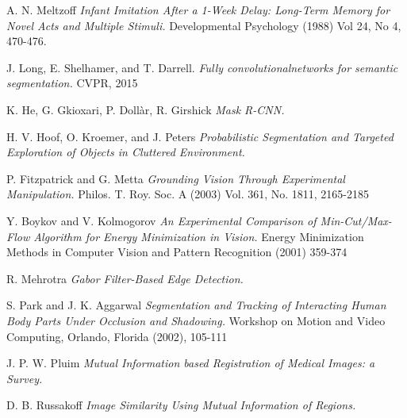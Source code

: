 \documentclass{article}
\begin{document}
\begin{thebibliography}{9}

	A. N. Meltzoff
	\emph{Infant Imitation After a 1-Week Delay: Long-Term Memory for Novel Acts and Multiple Stimuli.}
	Developmental Psychology (1988) Vol 24, No 4, 470-476.
	
	J. Long, E. Shelhamer, and T. Darrell. 
	\emph{Fully convolutionalnetworks for semantic segmentation.}
	CVPR, 2015

	K. He, G. Gkioxari, P. Doll\`ar, R. Girshick
	\emph{Mask R-CNN.}
	
  H. V. Hoof, O. Kroemer, and J. Peters
  \emph{Probabilistic Segmentation and Targeted Exploration of Objects in Cluttered Environment.}
  
	P. Fitzpatrick and G. Metta 
	\emph{Grounding Vision Through Experimental Manipulation.}
	Philos. T. Roy. Soc. A (2003) Vol. 361, No. 1811, 2165-2185
	
	Y. Boykov and V. Kolmogorov
	\emph{An Experimental Comparison of Min-Cut/Max-Flow Algorithm for Energy Minimization in Vision.}
	Energy Minimization Methods in Computer Vision and Pattern Recognition (2001) 359-374

	R. Mehrotra
	\emph{Gabor Filter-Based Edge Detection.}
	
	S. Park and J. K. Aggarwal
	\emph{Segmentation and Tracking of Interacting Human Body Parts Under Occlusion and Shadowing.} Workshop on Motion and Video Computing, Orlando, Florida (2002), 105-111

	J. P. W. Pluim
	\emph{Mutual Information based Registration of Medical Images: a Survey.}
	
	D. B. Russakoff
	\emph{Image Similarity Using Mutual Information of Regions.}
	
\end{thebibliography}
\end{document}
